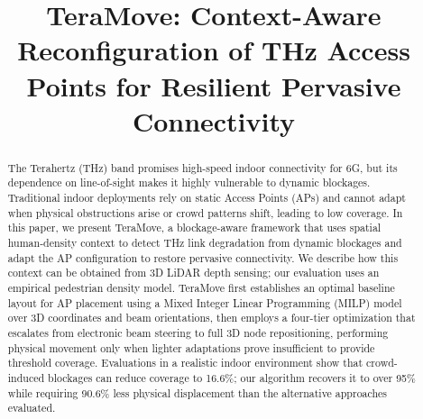 \documentclass[conference]{IEEEtran}
\begin{document}
\title{TeraMove: Context-Aware Reconfiguration of THz Access Points for Resilient Pervasive Connectivity}

\maketitle


\begin{abstract}
The Terahertz (THz) band promises high-speed indoor
connectivity for 6G, but its dependence on line-of-sight
makes it highly vulnerable to dynamic blockages. Traditional indoor deployments rely on static Access Points (APs) and cannot adapt when physical obstructions arise
or crowd patterns shift, leading to low coverage. In this
paper, we present TeraMove, a blockage-aware framework that
uses spatial human-density context to detect THz link degradation
from dynamic blockages and adapt the AP configuration to restore
pervasive connectivity. We describe how this context can be obtained from 3D LiDAR depth sensing; our evaluation uses an empirical pedestrian density model.
TeraMove first establishes an optimal baseline layout for AP placement using a Mixed Integer Linear Programming (MILP) model over 3D
coordinates and beam orientations, then employs a four-tier optimization that escalates from electronic beam steering to full 3D
node repositioning, performing physical movement only when lighter
adaptations prove insufficient to provide threshold coverage.
Evaluations in a realistic indoor environment show that crowd-induced
blockages can reduce coverage to 16.6\%; our algorithm recovers it
to over 95\% while requiring 90.6\% less physical displacement than
the alternative approaches evaluated.
\end{abstract}
\end{document}

